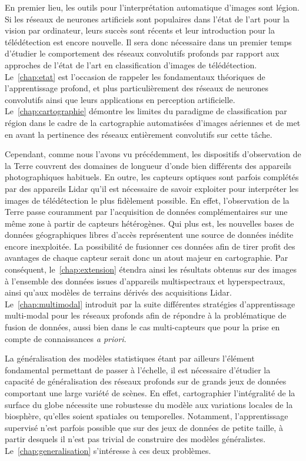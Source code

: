 En premier lieu, les outils pour l'interprétation automatique d'images sont légion. Si les réseaux de neurones artificiels sont populaires dans l'état de l'art pour la vision par ordinateur, leurs succès sont récents et leur introduction pour la télédétection est encore nouvelle. Il sera donc nécessaire dans un premier temps d'étudier le comportement des réseaux convolutifs profonds par rapport aux approches de l'état de l'art en classification d'images de télédétection. Le~\cref{chap:etat} est l'occasion de rappeler les fondamentaux théoriques de l'apprentissage profond, et plus particulièrement des réseaux de neurones convolutifs ainsi que leurs applications en perception artificielle. Le~\cref{chap:cartographie} démontre les limites du paradigme de classification par région dans le cadre de la cartographie automatisées d'images aériennes et de met en avant la pertinence des réseaux entièrement convolutifs sur cette tâche.

Cependant, comme nous l'avons vu précédemment, les dispositifs d'observation de la Terre couvrent des domaines de longueur d'onde bien différents des appareils photographiques habituels. En outre, les capteurs optiques sont parfois complétés par des appareils Lidar qu'il est nécessaire de savoir exploiter pour interpréter les images de télédétection le plus fidèlement possible. En effet, l'observation de la Terre passe couramment par l'acquisition de données complémentaires sur une même zone à partir de capteurs hétérogènes. Qui plus est, les nouvelles bases de données géographiques libres d'accès représentent une source de données inédite encore inexploitée. La possibilité de fusionner ces données afin de tirer profit des avantages de chaque capteur serait donc un atout majeur en cartographie. Par conséquent, le~\cref{chap:extension} étendra ainsi les résultats obtenus sur des images  à l'ensemble des données issues d'appareils multispectraux et hyperspectraux, ainsi qu'aux modèles de terrains dérivés des acquisitions Lidar. Le~\cref{chap:multimodal} introduit par la suite différentes stratégies d'apprentissage multi-modal pour les réseaux profonds afin de répondre à la problématique de fusion de données, aussi bien dans le cas multi-capteurs que pour la prise en compte de connaissances \emph{a priori}.

La généralisation des modèles statistiques étant par ailleurs l'élément fondamental permettant de passer à l'échelle, il est nécessaire d'étudier la capacité de généralisation des réseaux profonds sur de grands jeux de données comportant une large variété de scènes. En effet, cartographier l'intégralité de la surface du globe nécessite une robustesse du modèle aux variations locales de la biosphère, qu'elles soient spatiales ou temporelles. Notamment, l'apprentissage supervisé n'est parfois possible que sur des jeux de données de petite taille, à partir desquels il n'est pas trivial de construire des modèles généralistes. Le~\cref{chap:generalisation} s'intéresse à ces deux problèmes.

